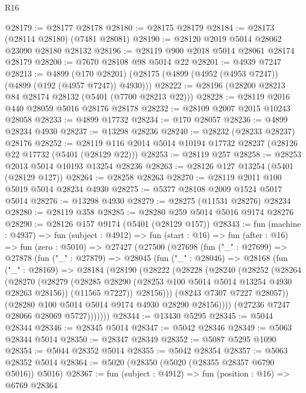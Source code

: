 \begin{lexlean}{R16}
\begin{coremodule}
@28179 := @28177 @28178
@28180 := @28175 @28179
@28184 := @28173 (@28114 @28180) (@7481 @28081)
@28190 := @28120 @2019 @5014 @28062 @23090 @28180 @28132
@28196 := @28119 @900 @2018 @5014 @28061 @28174 @28179
@28200 := @7670 @28108 @98 @5014 @22
@28201 := @4939 @7247
@28213 := @4899
    (@170 @28201)
    (@28175 (@4899 (@4952 (@4953 @7247)) (@4899 (@192 (@4957 @7247)) @4930)))
@28222 := @28196 (@28200 @28213 @84 @28174 @28132 (@5401 (@7700 @28213 @22)))
@28228 := @28119 @2016 @440 @28059 @5016 @28176 @28178
@28232 := @28109 @2007 @2015 @10243 @28058
@28233 := @4899 @17732
@28234 := @170 @28057
@28236 := @4899 @28234 @4930
@28237 := @13298 @28236
@28240 := @28232 (@28233 @28237) @28176
@28252 := @28119 @116 @2014 @5014 @10194 @17732 @28237 (@28126 @22 @17732 (@5401 (@28129 @22)))
@28253 := @28119 @257
@28258 := @28253 @2013 @5014 @10193 @13254 @28236
@28263 := @28126 @127 @13254 (@5401 (@28129 @127))
@28264 := @28258 @28263
@28270 := @28119 @2011 @100 @5019 @5014 @28234 @4930
@28275 := @5377 @28108 @2009 @1524 @5017 @5014
@28276 := @13298 @4930
@28279 := @28275 (@11531 @28276) @28234
@28280 := @28119 @358
@28285 := @28280 @259 @5014 @5016 @9174 @28276
@28290 := @28126 @157 @9174 (@5401 (@28129 @157))
@28343 := fun (machine : @4937) =>
  fun (subject : @4912) =>
  fun (start : @16) =>
  fun (after : @16) =>
  fun (zero : @5010) =>
  @27427
    (@27500
      (@27698
        (fun ("_" : @27699) =>
        @27878
          (fun ("_" : @27879) =>
          @28045
            (fun ("_" : @28046) =>
            @28168
              (fun ("_" : @28169) =>
              @28184
                (@28190
                  (@28222
                    (@28228
                      (@28240
                        (@28252
                          (@28264
                            (@28270
                              (@28279
                                (@28285 @28290 (@28253 @100 @5014 @5014 @13254 @4930 @28263 @28156))
                                (@11565 @7227))
                              @28156)))
                        (@8243 @7307 @7227 @28057))
                      (@28280 @100 @5014 @5014 @9174 @4930 @28290 @28156))))
                (@27236 @7247 @28066 @28069 @5727)))))))
@28344 := @13430 @5295
@28345 := @5044 @28344
@28346 := @28345 @5014
@28347 := @5042 @28346
@28349 := @5063 @28344 @5014
@28350 := @28347 @28349
@28352 := @5087 @5295 @1090
@28354 := @5044 @28352 @5014
@28355 := @5042 @28354
@28357 := @5063 @28352 @5014
@28364 := @5020 (@28350 (@5020 (@28355 @28357 @6790 @5016)) @5016)
@28367 := fun (subject : @4912) => fun (position : @16) => @6769 @28364

\end{coremodule}
\end{lexlean}
